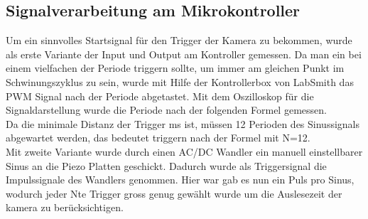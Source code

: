 \subsection{Signalverarbeitung am Mikrokontroller}
Um ein sinnvolles Startsignal für den Trigger der Kamera zu bekommen, wurde als erste Variante der Input und Output am Kontroller gemessen. Da man ein bei einem vielfachen der Periode triggern sollte, um immer am gleichen Punkt im Schwinungszyklus zu sein, wurde mit Hilfe der Kontrollerbox von LabSmith das PWM Signal nach der Periode abgetastet. Mit dem Oszilloskop für die Signaldarstellung wurde die Periode nach der folgenden Formel gemessen.\\
Da die minimale Distanz der Trigger ms ist, müssen 12 Perioden des Sinussignals abgewartet werden, das bedeutet triggern nach der Formel mit N=12.\\
Mit zweite Variante wurde durch einen AC/DC Wandler ein manuell einstellbarer Sinus an die Piezo Platten geschickt. Dadurch wurde als Triggersignal die Impulssignale des Wandlers genommen. Hier war gab es nun ein Puls pro Sinus, wodurch jeder Nte Trigger gross genug gewählt wurde um die Auslesezeit der kamera zu berücksichtigen.   